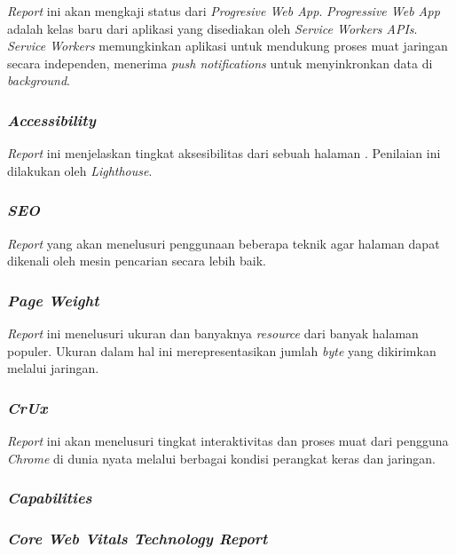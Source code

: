\textit{Report} ini akan mengkaji status dari \textit{Progresive Web App}. \textit{Progressive Web App} adalah kelas baru dari aplikasi \web yang disediakan oleh \textit{Service Workers APIs}. \textit{Service Workers} memungkinkan aplikasi untuk mendukung proses muat jaringan secara independen, menerima \textit{push notifications} untuk menyinkronkan data di \textit{background}.


\subsubsection{\textit{Accessibility}}
\label{subsub:access}

\textit{Report} ini menjelaskan tingkat aksesibilitas dari sebuah halaman \web. Penilaian ini dilakukan oleh \textit{Lighthouse}.


\subsubsection{\textit{SEO}}
\label{subsub:seo}

\textit{Report} yang akan menelusuri penggunaan beberapa teknik agar halaman \web dapat dikenali oleh mesin pencarian secara lebih baik.

\subsubsection{\textit{Page Weight}}
\label{subsub:pageweight}

\textit{Report} ini menelusuri ukuran dan banyaknya \textit{resource} dari banyak halaman \web populer. Ukuran dalam hal ini merepresentasikan jumlah \textit{byte} yang dikirimkan melalui jaringan.

\subsubsection{\textit{CrUx}}
\label{subsub:crux}

\textit{Report} ini akan menelusuri tingkat interaktivitas dan proses muat dari pengguna \textit{Chrome} di dunia nyata melalui berbagai kondisi perangkat keras dan jaringan.

\subsubsection{\textit{Capabilities}}
\label{subsub:capable}



\subsubsection{\textit{Core Web Vitals Technology Report}}

